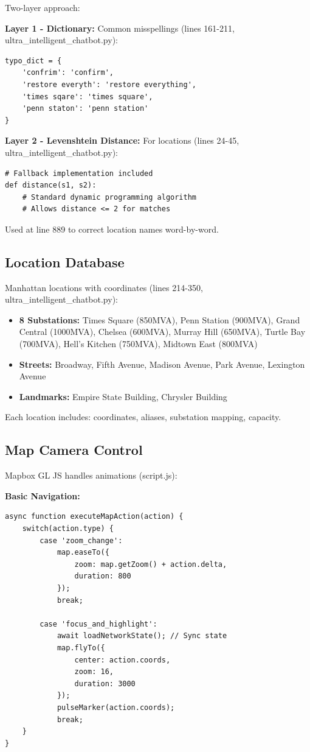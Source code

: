 \documentclass[sigconf]{acmart}
\begin{document}
Two-layer approach:

\textbf{Layer 1 - Dictionary:} Common misspellings (lines 161-211, ultra\_intelligent\_chatbot.py):
\begin{verbatim}
typo_dict = {
    'confrim': 'confirm',
    'restore everyth': 'restore everything',
    'times sqare': 'times square',
    'penn staton': 'penn station'
}
\end{verbatim}

\textbf{Layer 2 - Levenshtein Distance:} For locations (lines 24-45, ultra\_intelligent\_chatbot.py):
\begin{verbatim}
# Fallback implementation included
def distance(s1, s2):
    # Standard dynamic programming algorithm
    # Allows distance <= 2 for matches
\end{verbatim}

Used at line 889 to correct location names word-by-word.

\subsection{Location Database}

Manhattan locations with coordinates (lines 214-350, ultra\_intelligent\_chatbot.py):

\begin{itemize}
    \item \textbf{8 Substations:} Times Square (850MVA), Penn Station (900MVA), Grand Central (1000MVA), Chelsea (600MVA), Murray Hill (650MVA), Turtle Bay (700MVA), Hell's Kitchen (750MVA), Midtown East (800MVA)
    \item \textbf{Streets:} Broadway, Fifth Avenue, Madison Avenue, Park Avenue, Lexington Avenue
    \item \textbf{Landmarks:} Empire State Building, Chrysler Building
\end{itemize}

Each location includes: coordinates, aliases, substation mapping, capacity.

\subsection{Map Camera Control}

Mapbox GL JS handles animations (script.js):

\textbf{Basic Navigation:}
\begin{verbatim}
async function executeMapAction(action) {
    switch(action.type) {
        case 'zoom_change':
            map.easeTo({
                zoom: map.getZoom() + action.delta,
                duration: 800
            });
            break;

        case 'focus_and_highlight':
            await loadNetworkState(); // Sync state
            map.flyTo({
                center: action.coords,
                zoom: 16,
                duration: 3000
            });
            pulseMarker(action.coords);
            break;
    }
}
\end{verbatim}
\end{document}
